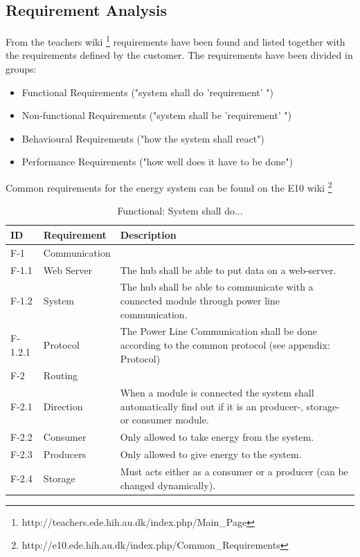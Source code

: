 \subsection{Requirement Analysis}
From the teachers wiki \footnote{http://teachers.ede.hih.au.dk/index.php/Main\_Page} requirements have been found and listed together with the requirements defined by the customer. The requirements have been divided in groups:
\begin{itemize}
	\item Functional Requirements ("system shall do 'requirement' ")
	\item Non-functional Requirements ("system shall be 'requirement' ")
	\item Behavioural Requirements ("how the system shall react")
	\item Performance Requirements ("how well does it have to be done")
\end{itemize}
Common requirements for the energy system can be found on the E10 wiki \footnote{http://e10.ede.hih.au.dk/index.php/Common\_Requirements}
\begin{table}[H]
	\begin{tabular} [b] {| p{1.2cm} |  p{3.5cm} | p{11.3cm} |}
	\hline
	\textbf{ID} & \textbf{Requirement} & \textbf{Description} \\\hline
		F-1 & Communication 	&  \\ \hline
		F-1.1 & Web Server 		& The hub shall be able to put data on a web-server. \\ \hline
		F-1.2 & System 		& The hub shall be able to communicate with a connected module through power line communication. \\ \hline
		F-1.2.1 & Protocol 		& The Power Line Communication shall be done according to the common protocol (see appendix: Protocol)\\ \hline
		F-2 & Routing 			&  \\ \hline
		F-2.1 & Direction		& When a module is connected the system shall automatically find out if it is an producer-, storage- or consumer module.\\ \hline
		F-2.2 & Consumer		& Only allowed to take energy from the system. \\ \hline
		F-2.3 & Producers 		& Only allowed to give energy to the system. \\ \hline
		F-2.4 & Storage 		& Must acts either as a consumer or a producer (can be changed dynamically). \\ \hline
	\end{tabular}
	\caption{Functional: System shall do...}
\end{table}

